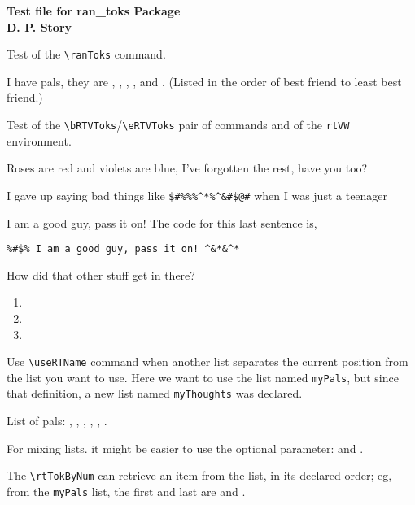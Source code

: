 \documentclass{article}
\begin{document}
\begin{center}\bfseries
    Test file for \textsf{ran\_toks} Package\\[3pt]
        D. P. Story
\end{center}

Test of the \verb!\ranToks! command.

I have {} pals, they are , ,
, , {} and . (Listed
in the order of best friend to least best friend.)

Test of the \verb!\bRTVToks!/\verb!\eRTVToks! pair of commands and of the
\texttt{rtVW} environment.

%
\begin{rtVW}
\begin{minipage}[t]{.67\linewidth}
Roses are red and violets are blue,
I've forgotten the rest, have you too?
\end{minipage}
\end{rtVW}
\begin{rtVW}
\begin{minipage}[t]{.67\linewidth}
I gave up saying bad things like
\verb!$#%%%^*%^&#$@#! when I was just a teenager
\end{minipage}
\end{rtVW}
\begin{rtVW}
\begin{minipage}[t]{.67\linewidth}
I am a good guy, pass it on! The code for this last sentence is,
\begin{verbatim}
%#$% I am a good guy, pass it on! ^&*&^*
\end{verbatim}
How did that other stuff get in there?
\end{minipage}
\end{rtVW}
\eRTVToks
\begin{enumerate}
    \item {}
    \item {}
    \item {}
\end{enumerate}

Use \verb!\useRTName! command when another list separates the current
position from the list you want to use. Here we want to use the list named
\texttt{myPals}, but since that definition, a new list named
\texttt{myThoughts} was declared.

List of pals: , , , ,
, .

For mixing lists. it might be easier to use the optional parameter:
{} and .

The \verb!\rtTokByNum! can retrieve an item from the list, in its declared
order; eg, from the \texttt{myPals} list, the first and last are {}
and .
\end{document}
